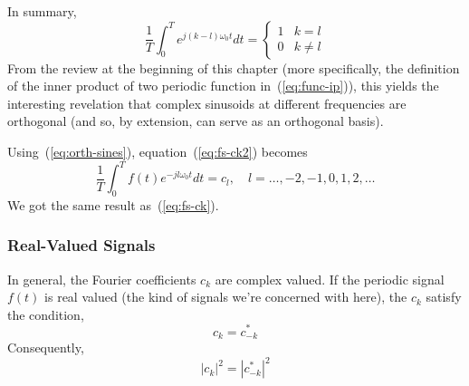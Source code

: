 In summary,
\begin{equation}
\frac{1}{T}\int_0^T e^{j(k-l)\omega_0t}dt
= \left\{\begin{array}{ll}
                        1 & k=l \\
                        0 & k \neq l
          \end{array}\right.
 \label{eq:orth-sines}
\end{equation}
From the review at the beginning of this chapter (more specifically,
the definition of the inner product of two periodic function
in~(\ref{eq:func-ip})), this yields the interesting revelation that
complex sinusoids at different frequencies are orthogonal (and so, by
extension, can serve as an orthogonal basis).

Using~(\ref{eq:orth-sines}), equation~(\ref{eq:fs-ck2}) becomes
\begin{equation}
\frac{1}{T}\int_0^T f(t)e^{-jl\omega_0t}dt = c_l, 
\quad l=\ldots, -2, -1, 0, 1, 2, \ldots
\end{equation}
We got the same result as~(\ref{eq:fs-ck}).

\subsubsection{Real-Valued Signals}

In general, the Fourier coefficients $c_k$ are complex valued. If the
periodic signal $f(t)$ is real valued (the kind of signals we're
concerned with here), the $c_k$ satisfy the condition,
\begin{equation}
c_k = c_{-k}^*
\label{eq:fs-cs3}
\end{equation}
Consequently, 
\begin{equation}
|c_k|^2 =|c_{-k}^*|^2
\label{eq:real-f-pspec}
\end{equation}

